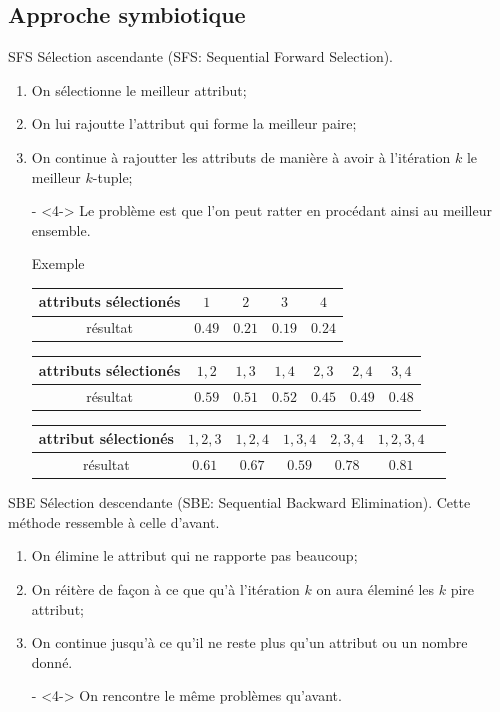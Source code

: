 \documentclass[9pt]{beamer}
\begin{document}
	\subsection[symbiotic approach]{Approche symbiotique}
	\begin{frame}{SFS}
		Sélection ascendante (SFS\@: Sequential Forward Selection).
		\begin{enumerate}
		\item<1-> On sélectionne le meilleur attribut;
		\item<2-> On lui rajoutte l'attribut qui forme la meilleur paire;
		\item<3-> On continue à rajoutter les attributs de manière à avoir à l'itération $k$ le meilleur $k$-tuple;
		\item[-]<4-> Le problème est que l'on peut ratter en procédant ainsi au meilleur ensemble.
		\begin{block}{Exemple}
			\begin{table}
				\begin{tabular}{c c c c c}
					\toprule
					attributs sélectionés & $1$ & $2$ & $3$ & $4$\\
					\midrule
					résultat& $0.49$ & $0.21$ & $0.19$ &$0.24$\\
					\bottomrule
				\end{tabular}
				\begin{tabular}{c c c c c c c}
					\toprule
					attributs sélectionés & $1,2$ & $1,3$ & $1,4$ & $2,3$ & $2,4$ & $3,4$\\
					\midrule
					résultat & $0.59$ & $0.51$ & $0.52$ & $0.45$ & $0.49$ & $0.48$\\
					\bottomrule
				\end{tabular}
				\begin{tabular}{c c c c c c c}
					\toprule
					attribut sélectionés & $1,2,3$ & $1,2,4$ & $1,3,4$ & $2,3,4$ & $1,2,3,4$\\
					\midrule
					résultat & $0.61$ & $0.67$ & $0.59$ & $0.78$ & $0.81$\\
					\bottomrule
				\end{tabular}
			\end{table}
		\end{block}
		\end{enumerate}
	\end{frame}

	\begin{frame}{SBE}
		Sélection descendante (SBE\@: Sequential Backward Elimination).
		Cette méthode ressemble à celle d'avant.
		\begin{enumerate}
		\item<1-> On élimine le attribut qui ne rapporte pas beaucoup;
		\item<2-> On réitère de façon à ce que qu'à l'itération $k$ on aura éleminé les $k$ pire attribut;
		\item<3-> On continue jusqu'à ce qu'il ne reste plus qu'un attribut ou un nombre donné.
		\item[-]<4-> On rencontre le même problèmes qu'avant.
		\end{enumerate}
	\end{frame}
\end{document}
